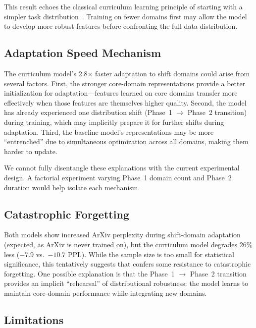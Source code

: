  This result echoes the classical curriculum learning principle of starting with a simpler task distribution~\cite{bengio2009curriculum}. Training on fewer domains first may allow the model to develop more robust features before confronting the full data distribution.

\subsection{Adaptation Speed Mechanism}

The curriculum model's 2.8$\times$ faster adaptation to shift domains could arise from several factors. First, the stronger core-domain representations provide a better initialization for adaptation---features learned on core domains transfer more effectively when those features are themselves higher quality. Second, the model has already experienced one distribution shift (Phase~1 $\to$ Phase~2 transition) during training, which may implicitly prepare it for further shifts during adaptation. Third, the baseline model's representations may be more ``entrenched'' due to simultaneous optimization across all domains, making them harder to update.

We cannot fully disentangle these explanations with the current experimental design. A factorial experiment varying Phase~1 domain count and Phase~2 duration would help isolate each mechanism.

\subsection{Catastrophic Forgetting}

Both models show increased ArXiv perplexity during shift-domain adaptation (expected, as ArXiv is never trained on), but the curriculum model degrades 26\% less ($-7.9$ vs.\ $-10.7$ PPL). While the sample size is too small for statistical significance, this tentatively suggests that \dsc confers some resistance to catastrophic forgetting. One possible explanation is that the Phase~1 $\to$ Phase~2 transition provides an implicit ``rehearsal'' of distributional robustness: the model learns to maintain core-domain performance while integrating new domains.

\subsection{Limitations}
\label{sec:limitations}

